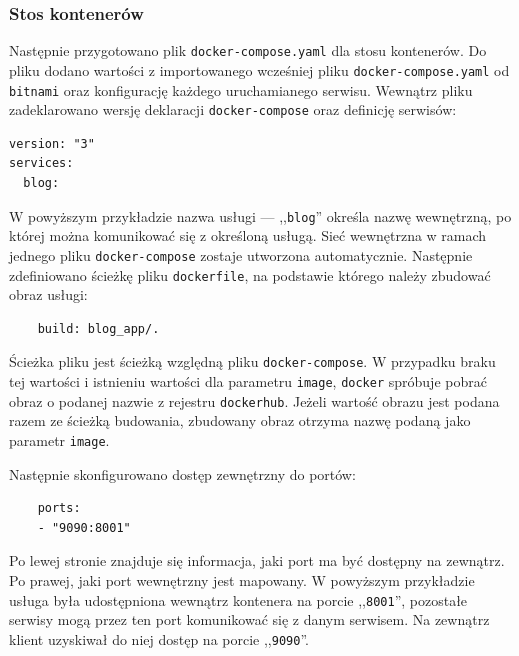 \documentclass[12pt,twoside]{article}
\begin{document}
\subsubsection{Stos kontenerów}
Następnie przygotowano plik \texttt{docker-compose.yaml} dla stosu kontenerów. Do pliku dodano wartości z importowanego wcześniej pliku \texttt{docker-compose.yaml} od \texttt{bitnami} oraz konfigurację każdego uruchamianego serwisu. Wewnątrz pliku zadeklarowano wersję deklaracji \texttt{docker-compose} oraz definicję serwisów:
\begin{lstlisting}
version: "3"
services:
  blog:
\end{lstlisting}
W powyższym przykładzie nazwa usługi — ,,\texttt{blog}'' określa nazwę wewnętrzną, po której można komunikować się z określoną usługą. Sieć wewnętrzna w ramach jednego pliku \texttt{docker-compose} zostaje utworzona automatycznie. Następnie zdefiniowano ścieżkę pliku \texttt{dockerfile}, na podstawie którego należy zbudować obraz usługi:
\begin{lstlisting}
    build: blog_app/.
\end{lstlisting}
Ścieżka pliku jest ścieżką względną pliku \texttt{docker-compose}. W przypadku braku tej wartości i istnieniu wartości dla parametru \texttt{image}, \texttt{docker} spróbuje pobrać obraz o podanej nazwie z rejestru \texttt{dockerhub}. Jeżeli wartość obrazu jest podana razem ze ścieżką budowania, zbudowany obraz otrzyma nazwę podaną jako parametr \texttt{image}.

Następnie skonfigurowano dostęp zewnętrzny do portów:
\begin{lstlisting}
    ports:
    - "9090:8001"
\end{lstlisting}
Po lewej stronie znajduje się informacja, jaki port ma być dostępny na zewnątrz. Po prawej, jaki port wewnętrzny jest mapowany. W powyższym przykładzie usługa była udostępniona wewnątrz kontenera na porcie ,,\texttt{8001}'', pozostałe serwisy mogą przez ten port komunikować się z danym serwisem. Na zewnątrz klient uzyskiwał do niej dostęp na porcie ,,\texttt{9090}''.
\end{document}
